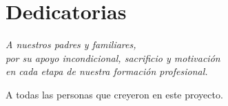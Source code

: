
\chapter*{Dedicatorias}


\begin{flushright}
\itshape
A nuestros padres y familiares,\\
por su apoyo incondicional, sacrificio y motivación\\
en cada etapa de nuestra formación profesional.

\vspace{2em}
A todas las personas que creyeron en este proyecto.
\end{flushright}
